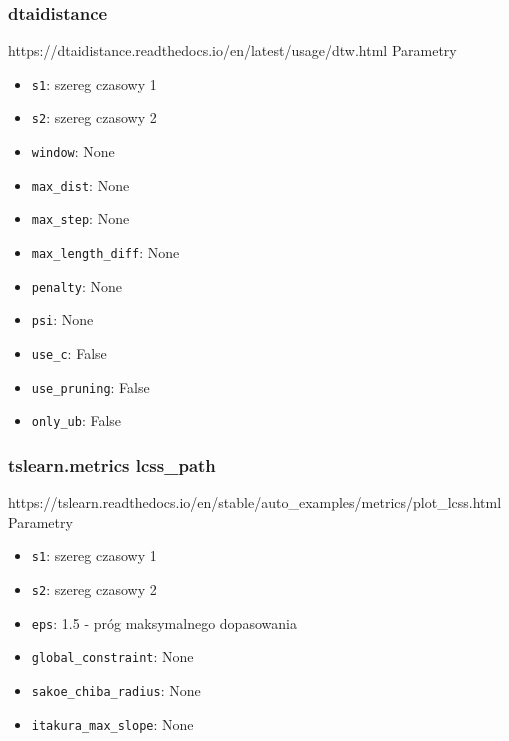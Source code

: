 \subsubsection{dtaidistance}
    https://dtaidistance.readthedocs.io/en/latest/usage/dtw.html
    \newline Parametry \begin{itemize}
        \item \texttt{s1}: szereg czasowy 1
        \item \texttt{s2}: szereg czasowy 2
        \item \texttt{window}: None
        \item \texttt{max\_dist}: None
        \item \texttt{max\_step}: None
        \item \texttt{max\_length\_diff}: None
        \item \texttt{penalty}: None
        \item \texttt{psi}: None
        \item \texttt{use\_c}: False
        \item \texttt{use\_pruning}: False
        \item \texttt{only\_ub}: False
    \end{itemize}

\subsubsection{tslearn.metrics lcss\_path}
    https://tslearn.readthedocs.io/en/stable/auto\_examples/metrics/plot\_lcss.html
    \newline Parametry \begin{itemize}
        \item \texttt{s1}: szereg czasowy 1
        \item \texttt{s2}: szereg czasowy 2
        \item \texttt{eps}: 1.5 - próg maksymalnego dopasowania 
        \item \texttt{global\_constraint}: None
        \item \texttt{sakoe\_chiba\_radius}: None
        \item \texttt{itakura\_max\_slope}: None
    \end{itemize}
    
